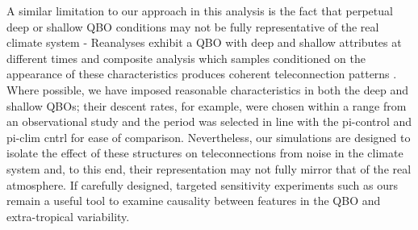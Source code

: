 A similar limitation to our approach in this analysis is the fact that perpetual deep or shallow QBO conditions may not be fully representative of the real climate system - Reanalyses exhibit a QBO with deep and shallow attributes at different times and composite analysis which samples conditioned on the appearance of these characteristics produces coherent teleconnection patterns \citep{andrewsObserved2019d}. Where possible, we have imposed reasonable characteristics in both the deep and shallow QBOs; their descent rates, for example, were chosen within a range from an observational study \citep{kinnersleyDescent1996} and the period was selected in line with the pi-control and pi-clim cntrl for ease of comparison. Nevertheless, our simulations are designed to isolate the effect of these structures on teleconnections from noise in the climate system and, to this end, their representation may not fully mirror that of the real atmosphere. If carefully designed, targeted sensitivity experiments such as ours remain a useful tool to examine causality between features in the QBO and extra-tropical variability.

